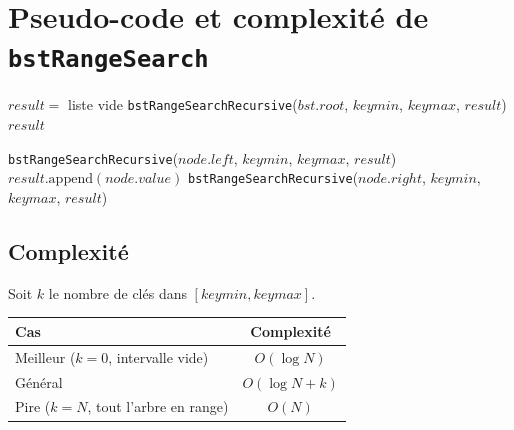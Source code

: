 \section{Pseudo-code et complexité de \texttt{bstRangeSearch}}

\begin{algorithm}[H]
\caption{\texttt{bstRangeSearch}($bst$, $keymin$, $keymax$)}
\begin{algorithmic}[1]
\State $result =$ liste vide
\State \texttt{bstRangeSearchRecursive}($bst.root$, $keymin$, $keymax$, $result$)
\State \Return $result$
\end{algorithmic}
\end{algorithm}

\begin{algorithm}[H]
\caption{\texttt{bstRangeSearchRecursive}($node$, $keymin$, $keymax$, $result$)}
\begin{algorithmic}[1]
 \Return \EndIf
{}
    \State \texttt{bstRangeSearchRecursive}($node.left$, $keymin$, $keymax$, $result$)
\EndIf
{}
    \State $result.\text{append}(node.value)$
\EndIf
{}
    \State \texttt{bstRangeSearchRecursive}($node.right$, $keymin$, $keymax$, $result$)
\EndIf
\end{algorithmic}
\end{algorithm}

\subsection*{Complexité}

Soit $k$ le nombre de clés dans $[keymin, keymax]$.

\begin{center}
\begin{tabular}{lc}
\toprule
Cas & Complexité \\
\midrule
Meilleur ($k=0$, intervalle vide) & $O(\log N)$ \\
Général & $O(\log N + k)$ \\
Pire ($k=N$, tout l'arbre en range) & $O(N)$ \\
\bottomrule
\end{tabular}
\end{center}

